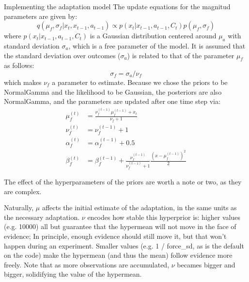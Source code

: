 \documentclass{report}
\begin{document}
\begin{chapter}{Implementing the adaptation model}
The update equations for the magnitud parameters are given by:
\begin{equation}
q(\mu_f, \sigma_f | x_t, x_{t-1}, a_{t-1}) \propto p(x_t |
x_{t-1}, a_{t-1}, C_t)p(\mu_f, \sigma_f) \label{eqn:context-from-x}
\end{equation}
where $p(x_t | x_{t-1}, a_{t-1}, C_t)$ is a Gaussian distribution centered
around $\mu_a$ with standard deviation $\sigma_a$, which is a free parameter of
the model. It is assumed that the standard deviation over outcomes ($\sigma_a$)
is related to that of the parameter $\mu_f$ as follows:
\begin{equation}
\sigma_f = \sigma_a / \nu_f
\end{equation}
which makes $\nu_f$ a parameter to estimate. Because we chose the priors to be
NormalGamma and the likelihood to be Gaussian, the posteriors are also
NormalGamma, and the parameters are updated after one time step via:
\begin{align}
  \mu_f^{(t)} &= \frac{\nu_f^{(t-1)} \mu_f^{(t-1)} + x_t}{\nu_f + 1} \\
  \nu_f^{(t)} &= \nu_f^{(t-1)} + 1 \\
  \alpha_f^{(t)} &= \alpha_f^{(t-1)} + 0.5 \\
  \beta_f^{(t)} &= \beta_f^{(t-1)} + \frac{\nu_f^{(t-1)}}{\nu_f^{(t-1)} +
                  1}\frac{\left(x - \mu_f^{(t-1)}\right)^2}{2}
\end{align}

The effect of the hyperparameters of the priors are worth a note or two, as they are complex.

Naturally, $\mu$ affects the initial estimate of the adaptation, in the same
units as the necessary adaptation. $\nu$ encodes how stable this hyperprior is:
higher values (e.g. 10000) all but guarantee that the hypermean will not move
in the face of evidence; In principle, enough evidence should still move it,
but that won't happen during an experiment. Smaller values (e.g. 1 / force\_sd,
as is the default on the code) make the hypermean (and thus the mean) follow
evidence more freely. Note that as more observations are accumulated, $\nu$
becames bigger and bigger, solidifying the value of the hypermean.


\end{chapter}
\end{document}
